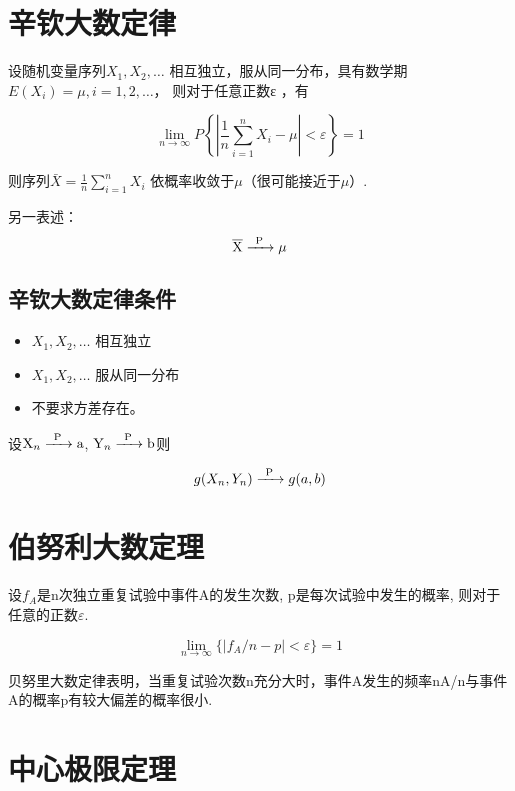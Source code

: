 \section{辛钦大数定律}

\begin{theorem}[辛钦大数定律]
    设随机变量序列$X_1,X_2, …$   相互独立，服从同一分布，具有数学期$E(X_i)=\mu, i=1,2,…$， 则对于任意正数ε ，有

$$\lim _{n \rightarrow \infty} P\left\{\left|\frac{1}{n} \sum_{i=1}^{n} X_{i}-\mu\right|<\varepsilon\right\}=1$$

则序列$\bar{X}=\frac{1}{n} \sum_{i=1}^{n} X_{i}$ 依概率收敛于$\mu$（很可能接近于$\mu$）.
\end{theorem}

另一表述：
$$\ce{\overline{X} ->[P] \mu}$$

\subsection{辛钦大数定律条件}

\begin{itemize}
    \item $X_1,X_2, …$ 相互独立
    \item $X_1,X_2, …$ 服从同一分布
    \item 不要求方差存在。
\end{itemize}

\begin{corollary}
设$\ce{X_n ->[P] a}$, $\ce{Y_n ->[P] b}$则

$$
   g(X_n, Y_n)\ce{->[P]} g(a,b)
$$
\end{corollary}

\section{伯努利大数定理}

\begin{theorem}[伯努利大数定理]
设$f_A$是n次独立重复试验中事件A的发生次数, p是每次试验中发生的概率, 则对于任意的正数$\varepsilon$.

$$
 \lim_{n \to \infty}\{ |f_A/n - p| < \varepsilon\} = 1  
$$
\end{theorem}

贝努里大数定律表明，当重复试验次数n充分大时，事件A发生的频率nA/n与事件A的概率p有较大偏差的概率很小.

\section{中心极限定理}

